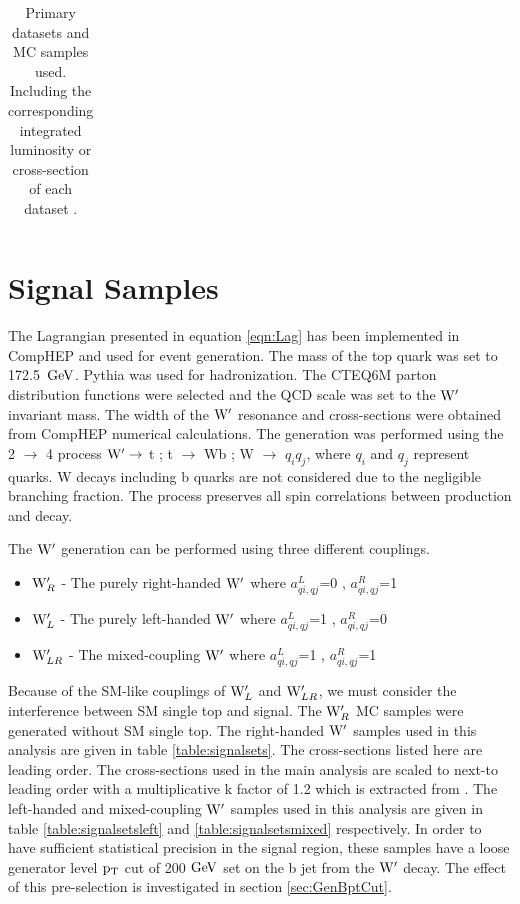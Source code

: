 \begin{table}
\begin{center}
\begin{tabular}{p{0.7\linewidth}|c}
\end{tabular}
\end{center}
\caption{Primary datasets and MC samples used. Including the corresponding integrated luminosity or cross-section of each dataset \cite{Czakon:2013goa,Kidonakis:2012db}.}
\label{table:datasets}
\end{table}

\section{Signal Samples}
\label{sec:signal}
The Lagrangian presented in equation \ref{eqn:Lag} has been implemented in CompHEP \cite{CompHEP} and used for event generation.  The mass of the top 
quark was set to 172.5~$\mathrm{GeV}$.  
Pythia was used for hadronization. The CTEQ6M parton distribution functions were selected and the QCD scale was set to the $\mathrm{W}^\prime$ invariant mass.  The width of 
the $\mathrm{W}^\prime$ resonance and cross-sections were obtained from CompHEP numerical calculations.  The generation was performed using the 2 $\rightarrow$ 4 
process $\mathrm{W}^\prime \rightarrow$ t ; t $\rightarrow$ Wb ; W $\rightarrow$ $q_{i}q_{j}$, where $q_{i}$ and $q_{j}$ represent quarks.  
W decays including b quarks are not considered due to the negligible branching fraction.  The process 
preserves all spin correlations between production and decay.

The $\mathrm{W}^\prime$ generation can be performed using three different couplings. 
\begin{itemize}
\item {\bf $\mathrm{W}^\prime_{R}$} - The purely right-handed $\mathrm{W}^\prime$ where $a_{qi,qj}^{L}$=0 , $a_{qi,qj}^{R}$=1 
\item {\bf $\mathrm{W}^\prime_{L}$} - The purely left-handed $\mathrm{W}^\prime$ where $a_{qi,qj}^{L}$=1 , $a_{qi,qj}^{R}$=0 
\item {\bf $\mathrm{W}^\prime_{LR}$} - The mixed-coupling $\mathrm{W}^\prime$ where $a_{qi,qj}^{L}$=1 , $a_{qi,qj}^{R}$=1 
\end{itemize}

Because of the SM-like couplings of $\mathrm{W}^\prime_{L}$ and $\mathrm{W}^\prime_{LR}$, we must consider the 
interference between SM single top and signal.  The $\mathrm{W}^\prime_{R}$ MC samples were generated without SM single top.  The right-handed $\mathrm{W}^\prime$ samples used in this analysis are given in table
\ref{table:signalsets}.  The cross-sections listed here are leading order.  The cross-sections 
used in the main analysis are scaled to next-to leading order with a multiplicative k factor of 1.2
which is extracted from \cite{kfactor}.  The left-handed and mixed-coupling $\mathrm{W}^\prime$ samples used 
in this analysis are given in table \ref{table:signalsetsleft} and \ref{table:signalsetsmixed} respectively.
In order to have sufficient statistical precision in the signal region, these samples have a loose generator 
level $\mathrm{p_{T}}$ cut of 200$~\mathrm{GeV}$ set on the b jet from the $\mathrm{W}^\prime$ decay.  The effect of this pre-selection is investigated in section \ref{sec:GenBptCut}.

